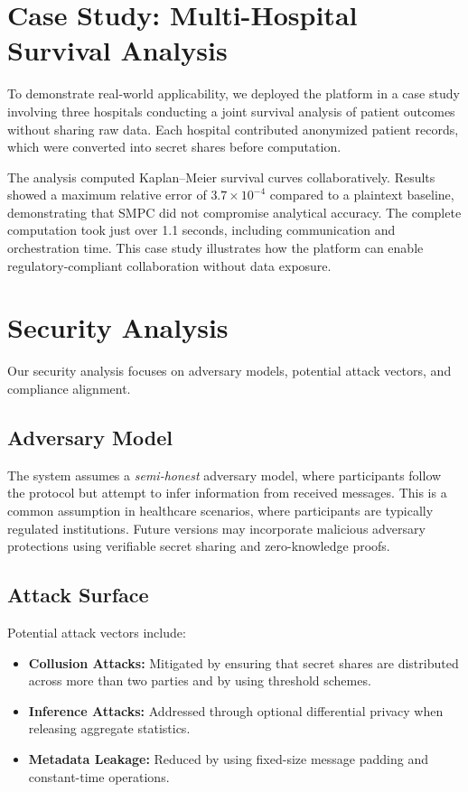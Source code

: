 \documentclass[conference]{IEEEtran}
\begin{document}
\section{Case Study: Multi-Hospital Survival Analysis}
To demonstrate real-world applicability, we deployed the platform in a case study involving three hospitals conducting a joint survival analysis of patient outcomes without sharing raw data. Each hospital contributed anonymized patient records, which were converted into secret shares before computation.

The analysis computed Kaplan–Meier survival curves collaboratively. Results showed a maximum relative error of $3.7 \times 10^{-4}$ compared to a plaintext baseline, demonstrating that SMPC did not compromise analytical accuracy. The complete computation took just over 1.1 seconds, including communication and orchestration time. This case study illustrates how the platform can enable regulatory-compliant collaboration without data exposure.

\section{Security Analysis}
Our security analysis focuses on adversary models, potential attack vectors, and compliance alignment.

\subsection{Adversary Model}
The system assumes a \textit{semi-honest} adversary model, where participants follow the protocol but attempt to infer information from received messages. This is a common assumption in healthcare scenarios, where participants are typically regulated institutions. Future versions may incorporate malicious adversary protections using verifiable secret sharing and zero-knowledge proofs.

\subsection{Attack Surface}
Potential attack vectors include:
\begin{itemize}
    \item \textbf{Collusion Attacks:} Mitigated by ensuring that secret shares are distributed across more than two parties and by using threshold schemes.
    \item \textbf{Inference Attacks:} Addressed through optional differential privacy when releasing aggregate statistics.
    \item \textbf{Metadata Leakage:} Reduced by using fixed-size message padding and constant-time operations.
\end{itemize}
\end{document}
